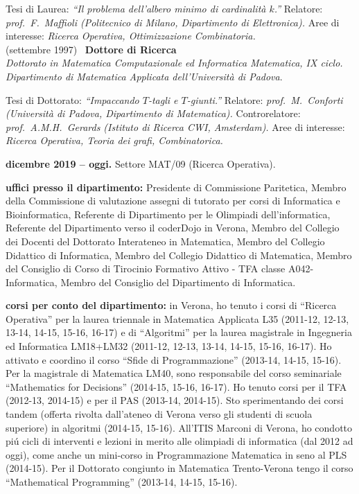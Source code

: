 Tesi di Laurea:
{\em ``Il problema dell'albero minimo di cardinalit\`a $k$.''}
Relatore:
{\em prof.~F.~Maffioli (Politecnico di Milano, Dipartimento di Elettronica).}
Aree di interesse:
{\em Ricerca Operativa, Ottimizzazione Combinatoria.}\\

\medskip \noindent
(settembre 1997) \
{\large \bf Dottore di Ricerca}\\
{\em Dottorato in Matematica Computazionale ed Informatica Matematica, IX ciclo.
Dipartimento di Ma\-te\-ma\-ti\-ca Applicata dell'Universit\`a di Padova}.

Tesi di Dottorato:
{\em ``Impaccando $T$-tagli e $T$-giunti.''}
Relatore:
{\em prof.~M.~Conforti (Universit\`a di Padova,
                Dipartimento di Ma\-te\-ma\-ti\-ca).}
Controrelatore:
{\em prof.~A.M.H.~Gerards (Istituto di Ricerca CWI, Amsterdam).}
Aree di interesse:
{\em Ricerca Operativa, Teoria dei grafi, Combinatorica.}\\



{\bf dicembre 2019 -- oggi.}
Settore MAT/09 (Ricerca Operativa).

{\bf uffici presso il dipartimento:} Presidente di Commissione Paritetica, Membro della Commissione di valutazione assegni di tutorato per corsi di Informatica e Bioinformatica, Referente di Dipartimento per le Olimpiadi dell'informatica, Referente del Dipartimento verso il coderDojo in Verona, Membro del Collegio dei Docenti del Dottorato Interateneo in Matematica, Membro del Collegio Didattico di Informatica, Membro del Collegio Didattico di Matematica, Membro del Consiglio di Corso di Tirocinio Formativo Attivo - TFA classe A042- Informatica, Membro del Consiglio del Dipartimento di Informatica.

{\bf corsi per conto del dipartimento:} in Verona,
ho tenuto i corsi
di ``Ricerca Operativa''
per la laurea triennale in Matematica Applicata L35 (2011-12, 12-13, 13-14, 14-15, 15-16, 16-17)
e di ``Algoritmi''
per la laurea magistrale in Ingegneria ed Informatica LM18+LM32 (2011-12, 12-13, 13-14, 14-15, 15-16, 16-17).
Ho attivato e coordino il corso ``Sfide di Programmazione'' (2013-14, 14-15, 15-16).
Per la magistrale di Matematica LM40, sono responsabile del corso seminariale ``Mathematics for Decisions'' (2014-15, 15-16, 16-17).
Ho tenuto corsi per il TFA (2012-13, 2014-15) e per il PAS (2013-14, 2014-15).
Sto sperimentando dei corsi tandem (offerta rivolta dall'ateneo di Verona verso gli studenti di scuola superiore) in algoritmi (2014-15, 15-16).
All'ITIS Marconi di Verona, ho condotto pi\'u cicli di interventi e lezioni in merito alle olimpiadi di informatica (dal 2012 ad oggi),
come anche un mini-corso in Programmazione Matematica in seno al PLS (2014-15). 
Per il Dottorato congiunto in Matematica Trento-Verona tengo il corso
``Mathematical Programming'' (2013-14, 14-15, 15-16).\\



